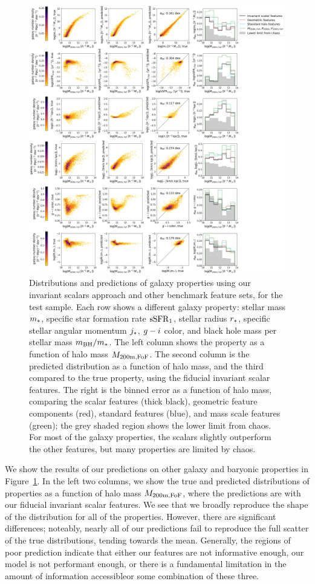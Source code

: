 \begin{figure}
    \centering
    \includegraphics[width=0.87\columnwidth]{pred_galprops.png}
    \caption{Distributions and predictions of galaxy properties using our invariant scalars approach and other benchmark feature sets, for the test sample. 
    Each row shows a different galaxy property: stellar mass $m_*$, specific star formation rate $\mathrm{sSFR}_1$, stellar radius $r_*$, specific stellar angular momentum $j_*$, $g-i$ color, and black hole mass per stellar mass $m_\mathrm{BH}/m_*$. 
    The left column shows the property as a function of halo mass $M_\mathrm{200m,FoF}$. 
    The second column is the predicted distribution as a function of halo mass, and the third compared to the true property, using the fiducial invariant scalar features.
    The right is the binned error as a function of halo mass, comparing the scalar features (thick black), geometric feature components (red), standard features (blue), and mass scale features (green); the grey shaded region shows the lower limit from chaos.
    For most of the galaxy properties, the scalars slightly outperform the other features, but many properties are limited by chaos.
    }
    \label{fig:galprops}
\end{figure}

We show the results of our predictions on other galaxy and baryonic properties in Figure~\ref{fig:galprops}.
In the left two columns, we show the true and predicted distributions of properties as a function of halo mass $M_\mathrm{200m,FoF}$, where the predictions are with our fiducial invariant scalar features.
We see that we broadly reproduce the shape of the distribution for all of the properties. 
However, there are significant differences; noteably, nearly all of our predictions fail to reproduce the full scatter of the true distributions, tending towards the mean.
Generally, the regions of poor prediction indicate that either our features are not informative enough, our model is not performant enough, or there is a fundamental limitation in the amount of information accessible{\emdash}or some combination of these three.

